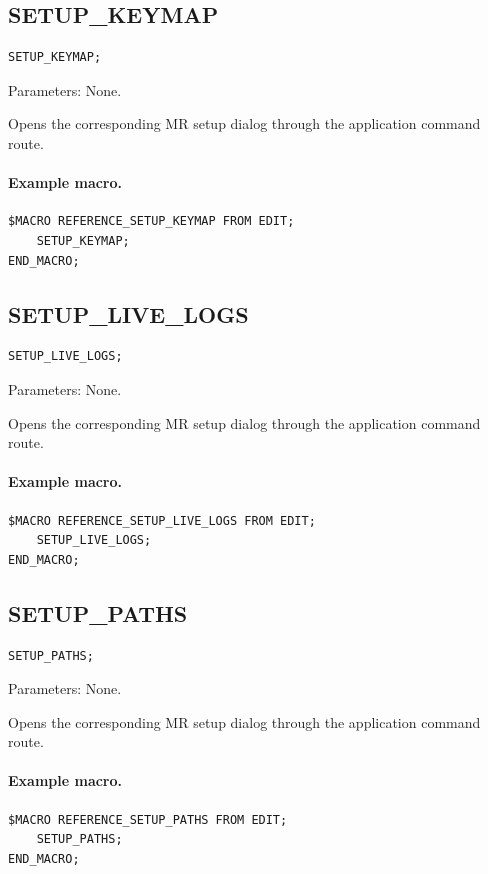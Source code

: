 \documentclass[a4paper,10pt,twoside,openany]{book}
\newenvironment{mrmacextension}{\begin{changebar}}{\end{changebar}}
\begin{document}
\begin{mrmacextension}
\label{prim:procedure-setup-keymap}
\subsection*{SETUP\_KEYMAP}
\begin{verbatim}
SETUP_KEYMAP;
\end{verbatim}
Parameters: None.

Opens the corresponding MR setup dialog through the application command route.

\paragraph{Example macro.}
\begin{verbatim}
$MACRO REFERENCE_SETUP_KEYMAP FROM EDIT;
    SETUP_KEYMAP;
END_MACRO;
\end{verbatim}
\end{mrmacextension}

\begin{mrmacextension}
\label{prim:procedure-setup-live-logs}
\subsection*{SETUP\_LIVE\_LOGS}
\begin{verbatim}
SETUP_LIVE_LOGS;
\end{verbatim}
Parameters: None.

Opens the corresponding MR setup dialog through the application command route.

\paragraph{Example macro.}
\begin{verbatim}
$MACRO REFERENCE_SETUP_LIVE_LOGS FROM EDIT;
    SETUP_LIVE_LOGS;
END_MACRO;
\end{verbatim}
\end{mrmacextension}

\begin{mrmacextension}
\label{prim:procedure-setup-paths}
\subsection*{SETUP\_PATHS}
\begin{verbatim}
SETUP_PATHS;
\end{verbatim}
Parameters: None.

Opens the corresponding MR setup dialog through the application command route.

\paragraph{Example macro.}
\begin{verbatim}
$MACRO REFERENCE_SETUP_PATHS FROM EDIT;
    SETUP_PATHS;
END_MACRO;
\end{verbatim}
\end{mrmacextension}
\end{document}
